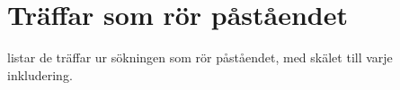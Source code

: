 \section{Träffar som rör påståendet}
\label{sec:sf-traffar}

 listar de träffar ur sökningen som rör
påståendet, med skälet till varje inkludering.

